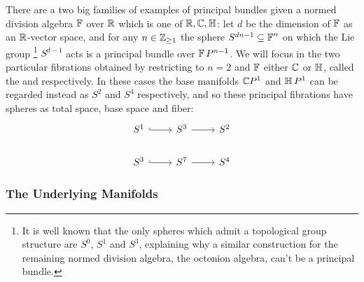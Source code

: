 There are a two big families of examples of principal bundles given a normed division algebra $\operatorname{\mathbb{F}}$ over $\mathbb{R}$ which is one of $\mathbb{R}, \mathbb{C}, \operatorname{\mathbb{H}}$: let $d$ be the dimension of $\operatorname{\mathbb{F}}$ as an $\mathbb{R}$-vector space, and for any $n \in \mathbb{Z}_{\geq 1}$ the sphere $S^{dn - 1} \subseteq \operatorname{\mathbb{F}}^n$ on which the Lie group
\footnote{It is well known that the only spheres which admit a topological group structure are $S^0$, $S^1$ and $S^3$, explaining why a similar construction for the remaining normed division algebra, the octonion algebra, can't be a principal bundle.} 
$S^{d-1}$ acts is a principal bundle over $\operatorname{\mathbb{F}} P^{n-1}$. We will focus in the two particular fibrations obtained by restricting to $n = 2$ and $\operatorname{\mathbb{F}}$ either $\mathbb{C}$ or $\operatorname{\mathbb{H}}$, called the  and  respectively. In these cases the base manifolds $\mathbb{C} P^1$ and $\operatorname{\mathbb{H}} P^1$ can be regarded instead as $S^2$ and $S^4$ respectively, and so these principal fibrations have spheres as total space, base space and fiber:
\begin{equation*}
    \begin{tikzcd}
    S^1 \arrow[hook]{r} & S^3 \arrow{r} & S^2\\
    S^3 \arrow[hook]{r} & S^7 \arrow{r} & S^4
    \end{tikzcd}
\end{equation*}


\subsubsection{The Underlying Manifolds}

